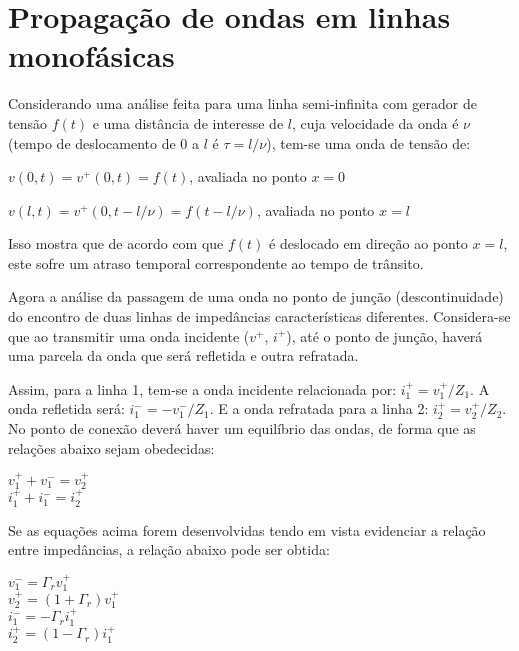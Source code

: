 \section{Propagação de ondas em linhas monofásicas}

Considerando uma análise feita para uma linha semi-infinita com gerador de tensão $f(t)$ e uma distância de interesse de $l$, cuja velocidade da onda é $\nu$ (tempo de deslocamento de 0 a $l$ é $\tau = l/\nu$), tem-se uma onda de tensão de:

\begin{center}
    $v(0,t) = v^{+}(0,t) = f(t)$, avaliada no ponto $x=0$
\end{center}
\begin{center}
    $v(l,t) = v^{+}(0,t-l/\nu) = f(t-l/\nu)$, avaliada no ponto $x=l$
\end{center}

Isso mostra que de acordo com que $f(t)$ é deslocado em direção ao ponto $x=l$, este sofre um atraso temporal correspondente ao tempo de trânsito.

Agora a análise da passagem de uma onda no ponto de junção (descontinuidade) do encontro de duas linhas de impedâncias características diferentes. Considera-se que ao transmitir uma onda incidente ($v^{+}$, $i^{+}$), até o ponto de junção, haverá uma parcela da onda que será refletida e outra refratada. 

Assim, para a linha 1, tem-se a onda incidente relacionada por: $i_1^{+}=v_1^{+}/Z_1$. A onda refletida será: $i_1^{-}=-v_1^{-}/Z_1$. E a onda refratada para a linha 2: $i_2^{+}=v_2^{+}/Z_2$. No ponto de conexão deverá haver um equilíbrio das ondas, de forma que as relações abaixo sejam obedecidas:

\begin{center}
    $v_1^{+} + v_1^{-} = v_2^{+}$ \\ \vspace{1pt}
    $i_1^{+} + i_1^{-} = i_2^{+}$
\end{center}

Se as equações acima forem desenvolvidas tendo em vista evidenciar a relação entre impedâncias, a relação abaixo pode ser obtida:

\begin{center}
    $v_1^{-} = \Gamma_r v_1^{+}$ \\ \vspace{1pt}
    $v_2^{+} = (1+\Gamma_r) v_1^{+}$ \\ \vspace{1pt}
    $i_1^{-} = -\Gamma_r i_1^{+}$ \\ \vspace{1pt}
    $i_2^{+} = (1-\Gamma_r) i_1^{+}$ 
\end{center}

